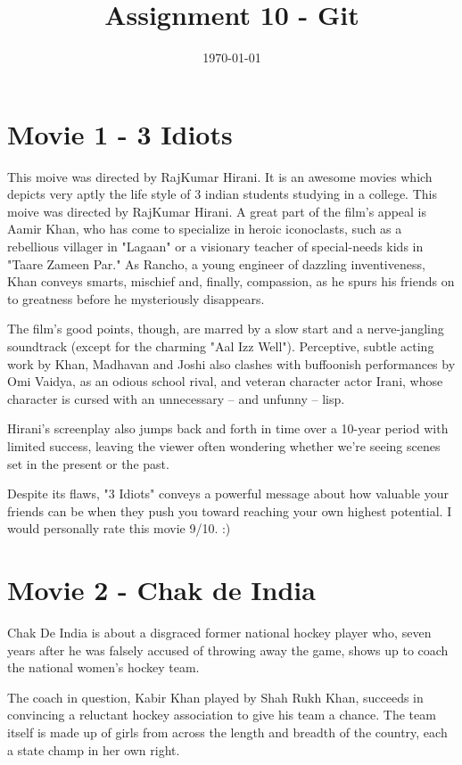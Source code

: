\documentclass[]{article}
\title{Assignment 10 - Git}
\date{\today}
\begin{document}
\maketitle
\section{Movie 1 - 3 Idiots}
This moive was directed by RajKumar Hirani. It is an awesome movies which depicts very aptly the life style of 3 indian students studying in a college.
This moive was directed by RajKumar Hirani.
A great part of the film's appeal is Aamir Khan, who has come to specialize in heroic iconoclasts, such as a rebellious villager in "Lagaan" or a visionary teacher of special-needs kids in "Taare Zameen Par." As Rancho, a young engineer of dazzling inventiveness, Khan conveys smarts, mischief and, finally, compassion, as he spurs his friends on to greatness before he mysteriously disappears.

The film's good points, though, are marred by a slow start and a nerve-jangling soundtrack (except for the charming "Aal Izz Well"). Perceptive, subtle acting work by Khan, Madhavan and Joshi also clashes with buffoonish performances by Omi Vaidya, as an odious school rival, and veteran character actor Irani, whose character is cursed with an unnecessary -- and unfunny -- lisp.

Hirani's screenplay also jumps back and forth in time over a 10-year period with limited success, leaving the viewer often wondering whether we're seeing scenes set in the present or the past.

Despite its flaws, "3 Idiots" conveys a powerful message about how valuable your friends can be when they push you toward reaching your own highest potential.
I would personally rate this movie 9/10. :)

\section{Movie 2 - Chak de India}
Chak De India is about a disgraced former national hockey player who, seven years after he was falsely accused of throwing away the game, shows up to coach the national women’s hockey team.

The coach in question, Kabir Khan played by Shah Rukh Khan, succeeds in convincing a reluctant hockey association to give his team a chance. The team itself is made up of girls from across the length and breadth of the country, each a state champ in her own right. 
\end{document}

